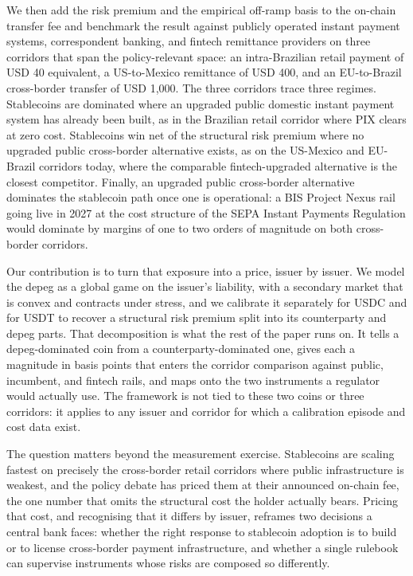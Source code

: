 We then add the risk premium and the empirical off-ramp basis to the on-chain transfer fee and benchmark the result against publicly operated instant payment systems, correspondent banking, and fintech remittance providers on three corridors that span the policy-relevant space: an intra-Brazilian retail payment of USD 40 equivalent, a US-to-Mexico remittance of USD 400, and an EU-to-Brazil cross-border transfer of USD 1{,}000. The three corridors trace three regimes. Stablecoins are dominated where an upgraded public domestic instant payment system has already been built, as in the Brazilian retail corridor where PIX clears at zero cost. Stablecoins win net of the structural risk premium where no upgraded public cross-border alternative exists, as on the US-Mexico and EU-Brazil corridors today, where the comparable fintech-upgraded alternative is the closest competitor. Finally, an upgraded public cross-border alternative dominates the stablecoin path once one is operational: a BIS Project Nexus rail going live in 2027 at the cost structure of the SEPA Instant Payments Regulation would dominate by margins of one to two orders of magnitude on both cross-border corridors.

Our contribution is to turn that exposure into a price, issuer by issuer. We model the depeg as a global game on the issuer's liability, with a secondary market that is convex and contracts under stress, and we calibrate it separately for USDC and for USDT to recover a structural risk premium split into its counterparty and depeg parts. That decomposition is what the rest of the paper runs on. It tells a depeg-dominated coin from a counterparty-dominated one, gives each a magnitude in basis points that enters the corridor comparison against public, incumbent, and fintech rails, and maps onto the two instruments a regulator would actually use. The framework is not tied to these two coins or three corridors: it applies to any issuer and corridor for which a calibration episode and cost data exist.

The question matters beyond the measurement exercise. Stablecoins are scaling fastest on precisely the cross-border retail corridors where public infrastructure is weakest, and the policy debate has priced them at their announced on-chain fee, the one number that omits the structural cost the holder actually bears. Pricing that cost, and recognising that it differs by issuer, reframes two decisions a central bank faces: whether the right response to stablecoin adoption is to build or to license cross-border payment infrastructure, and whether a single rulebook can supervise instruments whose risks are composed so differently.


